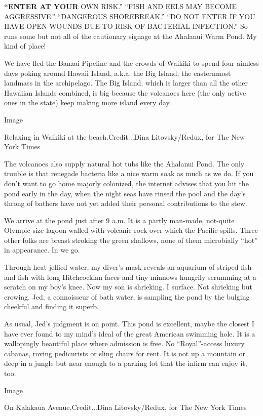 \textbf{``ENTER AT YOUR} OWN RISK.'' ``FISH AND EELS MAY BECOME
AGGRESSIVE.'' ``DANGEROUS SHOREBREAK.'' ``DO NOT ENTER IF YOU HAVE OPEN
WOUNDS DUE TO RISK OF BACTERIAL INFECTION.'' So runs some but not all of
the cautionary signage at the Ahalanui Warm Pond. My kind of place!

We have fled the Banzai Pipeline and the crowds of Waikiki to spend four
aimless days poking around Hawaii Island, a.k.a. the Big Island, the
easternmost landmass in the archipelago. The Big Island, which is larger
than all the other Hawaiian Islands combined, is big because the
volcanoes here (the only active ones in the state) keep making more
island every day.

Image

Relaxing in Waikiki at the beach.Credit...Dina Litovsky/Redux, for The
New York Times

The volcanoes also supply natural hot tubs like the Ahalanui Pond. The
only trouble is that renegade bacteria like a nice warm soak as much as
we do. If you don't want to go home majorly colonized, the internet
advises that you hit the pond early in the day, when the night seas have
rinsed the pool and the day's throng of bathers have not yet added their
personal contributions to the stew.

We arrive at the pond just after 9 a.m. It is a partly man-made,
not-quite Olympic-size lagoon walled with volcanic rock over which the
Pacific spills. Three other folks are breast stroking the green
shallows, none of them microbially ``hot'' in appearance. In we go.

Through heat-jellied water, my diver's mask reveals an aquarium of
striped fish and fish with long Hitchcockian faces and tiny minnows
hungrily scrumming at a scratch on my boy's knee. Now my son is
shrieking. I surface. Not shrieking but crowing. Jed, a connoisseur of
bath water, is sampling the pond by the bulging cheekful and finding it
superb.

As usual, Jed's judgment is on point. This pond is excellent, maybe the
closest I have ever found to my mind's ideal of the great American
swimming hole. It is a wallopingly beautiful place where admission is
free. No ``Royal''-access luxury cabanas, roving pedicurists or sling
chairs for rent. It is not up a mountain or deep in a jungle but near
enough to a parking lot that the infirm can enjoy it, too.

Image

On Kalakaua Avenue.Credit...Dina Litovsky/Redux, for The New York Times

